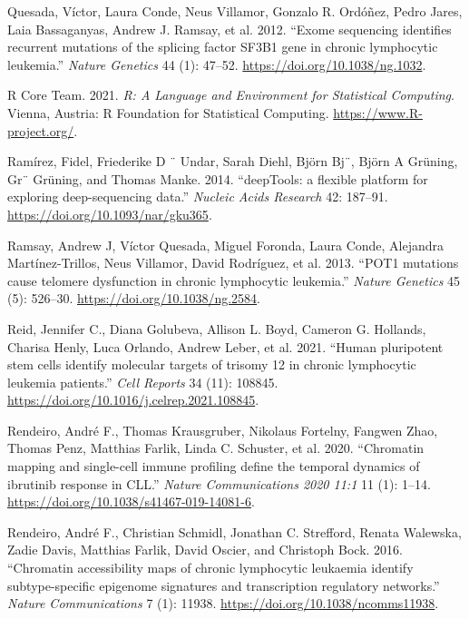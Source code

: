 \documentclass[11pt, a4paper, twosided]{book}
\newenvironment{CSLReferences}%
  {}%
  {\par}
\begin{document}
\begin{CSLReferences}{1}{0}
\leavevmode{}%
Quesada, Víctor, Laura Conde, Neus Villamor, Gonzalo R. Ordóñez, Pedro Jares, Laia Bassaganyas, Andrew J. Ramsay, et al. 2012. {``{Exome sequencing identifies recurrent mutations of the splicing factor SF3B1 gene in chronic lymphocytic leukemia}.''} \emph{Nature Genetics} 44 (1): 47--52. \url{https://doi.org/10.1038/ng.1032}.

\leavevmode{}%
R Core Team. 2021. \emph{R: A Language and Environment for Statistical Computing}. Vienna, Austria: R Foundation for Statistical Computing. \url{https://www.R-project.org/}.

\leavevmode{}%
Ramírez, Fidel, Friederike D ¨ Undar, Sarah Diehl, Björn Bj¨, Björn A Grüning, Gr¨ Grüning, and Thomas Manke. 2014. {``{deepTools: a flexible platform for exploring deep-sequencing data}.''} \emph{Nucleic Acids Research} 42: 187--91. \url{https://doi.org/10.1093/nar/gku365}.

\leavevmode{}%
Ramsay, Andrew J, Víctor Quesada, Miguel Foronda, Laura Conde, Alejandra Martínez-Trillos, Neus Villamor, David Rodríguez, et al. 2013. {``{POT1 mutations cause telomere dysfunction in chronic lymphocytic leukemia}.''} \emph{Nature Genetics} 45 (5): 526--30. \url{https://doi.org/10.1038/ng.2584}.

\leavevmode{}%
Reid, Jennifer C., Diana Golubeva, Allison L. Boyd, Cameron G. Hollands, Charisa Henly, Luca Orlando, Andrew Leber, et al. 2021. {``{Human pluripotent stem cells identify molecular targets of trisomy 12 in chronic lymphocytic leukemia patients}.''} \emph{Cell Reports} 34 (11): 108845. \url{https://doi.org/10.1016/j.celrep.2021.108845}.

\leavevmode{}%
Rendeiro, André F., Thomas Krausgruber, Nikolaus Fortelny, Fangwen Zhao, Thomas Penz, Matthias Farlik, Linda C. Schuster, et al. 2020. {``{Chromatin mapping and single-cell immune profiling define the temporal dynamics of ibrutinib response in CLL}.''} \emph{Nature Communications 2020 11:1} 11 (1): 1--14. \url{https://doi.org/10.1038/s41467-019-14081-6}.

\leavevmode{}%
Rendeiro, André F., Christian Schmidl, Jonathan C. Strefford, Renata Walewska, Zadie Davis, Matthias Farlik, David Oscier, and Christoph Bock. 2016. {``{Chromatin accessibility maps of chronic lymphocytic leukaemia identify subtype-specific epigenome signatures and transcription regulatory networks}.''} \emph{Nature Communications} 7 (1): 11938. \url{https://doi.org/10.1038/ncomms11938}.


\end{CSLReferences}
\end{document}
